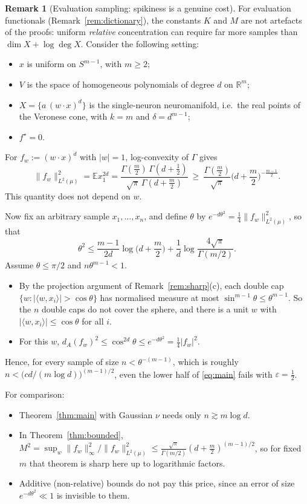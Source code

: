 \documentclass[11pt]{article}
\theoremstyle{definition}
\newtheorem{remark}[theorem]{Remark}
\numberwithin{equation}{section}
\newcommand{\R}{\mathbb{R}}
\newcommand{\E}{\mathbb{E}}
\newcommand{\eps}{\varepsilon}
\newcommand{\fs}{f^{\star}}
\begin{document}
\begin{remark}[Evaluation sampling: spikiness is a genuine cost]\label{rem:spiky}
For evaluation functionals (Remark~\ref{rem:dictionary}), the constants $K$ and $M$ are not artefacts of the proofs: uniform \emph{relative} concentration can require far more samples than $\dim X+\log\deg X$. Consider the following setting:
\begin{itemize}
\item $x$ is uniform on $S^{m-1}$, with $m\ge2$;
\item $V$ is the space of homogeneous polynomials of degree $d$ on $\R^m$;
\item $X=\{a\,(w\cdot x)^d\}$ is the single-neuron neuromanifold, i.e.\ the real points of the Veronese cone, with $k=m$ and $\delta=d^{m-1}$;
\item $\fs=0$.
\end{itemize}
For $f_w:=(w\cdot x)^d$ with $|w|=1$, log-convexity of $\Gamma$ gives
\[
\|f_w\|^2_{L^2(\mu)}=\E x_1^{2d}=\frac{\Gamma(\frac m2)\,\Gamma(d+\frac12)}{\sqrt\pi\,\Gamma(d+\frac m2)}\ \ge\ \frac{\Gamma(\frac m2)}{\sqrt\pi}\Big(d+\frac m2\Big)^{-\frac{m-1}2}.
\]
This quantity does not depend on $w$.

Now fix an arbitrary sample $x_1,\dots,x_n$, and define $\theta$ by $e^{-d\theta^2}=\frac14\|f_w\|^2_{L^2(\mu)}$, so that
\[
\theta^2\le\frac{m-1}{2d}\log\Big(d+\frac m2\Big)+\frac1d\log\frac{4\sqrt\pi}{\Gamma(m/2)} .
\]
Assume $\theta\le\pi/2$ and $n\theta^{m-1}<1$.
\begin{itemize}
\item By the projection argument of Remark~\ref{rem:sharp}(c), each double cap $\{w:|\langle w,x_i\rangle|>\cos\theta\}$ has normalised measure at most $\sin^{m-1}\theta\le\theta^{m-1}$. So the $n$ double caps do not cover the sphere, and there is a unit $w$ with $|\langle w,x_i\rangle|\le\cos\theta$ for all $i$.
\item For this $w$, $d_A(f_w)^2\le\cos^{2d}\theta\le e^{-d\theta^2}=\frac14|f_w|^2$.
\end{itemize}
Hence, for every sample of size $n<\theta^{-(m-1)}$, which is roughly $n<\big(cd/(m\log d)\big)^{(m-1)/2}$, even the lower half of \eqref{eq:main} fails with $\eps=\frac12$.

For comparison:
\begin{itemize}
\item Theorem~\ref{thm:main} with Gaussian $\nu$ needs only $n\gtrsim m\log d$.
\item In Theorem~\ref{thm:bounded}, $M^2=\sup_w\|f_w\|_\infty^2/\|f_w\|^2_{L^2(\mu)}\le\frac{\sqrt\pi}{\Gamma(m/2)}(d+\frac m2)^{(m-1)/2}$, so for fixed $m$ that theorem is sharp here up to logarithmic factors.
\item Additive (non-relative) bounds do not pay this price, since an error of size $e^{-d\theta^2}\ll1$ is invisible to them.
\end{itemize}
\end{remark}
\end{document}
